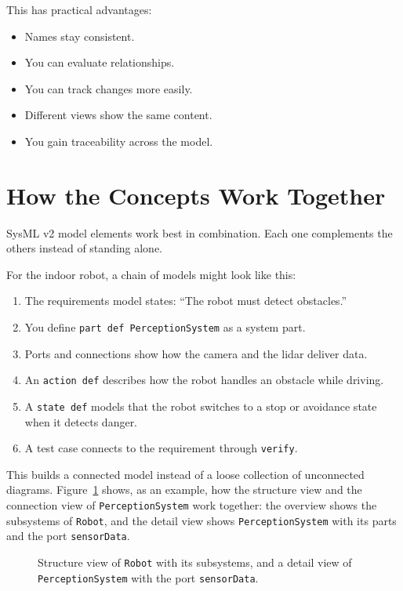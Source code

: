 This has practical advantages:

\begin{itemize}
    \item Names stay consistent.
    \item You can evaluate relationships.
    \item You can track changes more easily.
    \item Different views show the same content.
    \item You gain traceability across the model.
\end{itemize}

\section{How the Concepts Work Together}
SysML v2 model elements work best in combination. Each one complements the others instead of standing alone.

For the indoor robot, a chain of models might look like this:

\begin{enumerate}
    \item The requirements model states: \enquote{The robot must detect obstacles.}
    \item You define \texttt{part def PerceptionSystem} as a system part.
    \item Ports and connections show how the camera and the lidar deliver data.
    \item An \texttt{action def} describes how the robot handles an obstacle while driving.
    \item A \texttt{state def} models that the robot switches to a stop or avoidance state when it detects danger.
    \item A test case connects to the requirement through \texttt{verify}.
\end{enumerate}

This builds a connected model instead of a loose collection of unconnected diagrams. Figure~\ref{fig:kap03-struktur-verbindungssicht} shows, as an example, how the structure view and the connection view of \texttt{PerceptionSystem} work together: the overview shows the subsystems of \texttt{Robot}, and the detail view shows \texttt{PerceptionSystem} with its parts and the port \texttt{sensorData}.

\begin{figure}[H]
  \centering
  \caption{Structure view of \texttt{Robot} with its subsystems, and a detail view of \texttt{PerceptionSystem} with the port \texttt{sensorData}.}
  \label{fig:kap03-struktur-verbindungssicht}
\end{figure}

